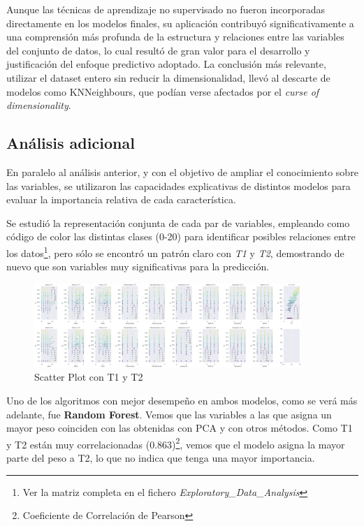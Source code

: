 \documentclass{article}
\begin{document}
Aunque las técnicas de aprendizaje no supervisado no fueron incorporadas directamente en los modelos finales, su aplicación contribuyó significativamente a una comprensión más profunda de la estructura y relaciones entre las variables del conjunto de datos, lo cual resultó de gran valor para el desarrollo y justificación del enfoque predictivo adoptado.
La conclusión más relevante, utilizar el dataset entero sin reducir la dimensionalidad, llevó al descarte de modelos como KNNeighbours, que podían verse afectados por el \textit{curse of dimensionality}.

\subsection{Análisis adicional}


En paralelo al análisis anterior, y con el objetivo de ampliar el conocimiento sobre las variables, se utilizaron las capacidades explicativas de distintos modelos para evaluar la importancia relativa de cada característica.

Se estudió la representación conjunta de cada par de variables, empleando como código de color las distintas clases (0-20) para identificar posibles relaciones entre los datos\footnote{Ver la matriz completa en el fichero \textit{Exploratory\_Data\_Analysis}}, pero sólo se encontró un patrón claro con \textit{T1} y \textit{T2}, 
demostrando de nuevo que son variables muy significativas para la predicción.

\begin{figure}[ht]
  \centering
  \includegraphics[width=0.9\textwidth]{Plot_Var_T1T2.png}
  \caption{Scatter Plot con T1 y T2}\label{fig:scatter}
\end{figure}

Uno de los algoritmos con mejor desempeño en ambos modelos, como se verá más adelante, fue \textbf{Random Forest}. Vemos que las variables a las que asigna un mayor peso coinciden con las obtenidas con PCA y con otros métodos. Como T1 y T2 están muy correlacionadas (0.863)\footnote{Coeficiente de Correlación de Pearson},
vemos que el modelo asigna la mayor parte del peso a T2, lo que no indica que tenga una mayor importancia.
\end{document}
